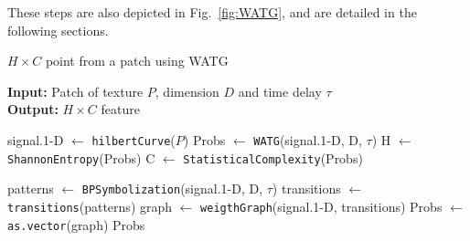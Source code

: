\documentclass[journal]{IEEEtran}
\begin{document}
	These steps are also depicted in Fig.~\ref{fig:WATG}, and are detailed in the following sections.
	
	\begin{algorithm}[hbt]
		\caption{$H \times C$ point from a patch using WATG}
		\label{alg:watg}                                
		\textbf{Input:} Patch of texture $P$, dimension $D$ and time delay \textbf{$\tau$}\\
		\textbf{Output:} $H \times C$ feature
		\begin{algorithmic}[1]
			\State signal.\mbox{1-D} $\gets$ \texttt{hilbertCurve}($P$) \label{Line:Peano}
			\State Probs $\gets$ \texttt{WATG}(signal.\mbox{1-D}, D, $\tau$) \label{Line:Probs}
			\State H $\gets$ \texttt{ShannonEntropy}(Probs) \label{Line:Shannon}
			\State C $\gets$ \texttt{StatisticalComplexity}(Probs) \label{Line:StatisticalComplexity}
			
			\vspace{0.15cm}
			
			\State patterns $\gets$ \label{Line:WATGBegin} \texttt{BPSymbolization}(signal.\mbox{1-D}, D, $\tau$) \label{Line:BP}
			\State transitions $\gets$ \texttt{transitions}(patterns) \label{Line:Transitions}
			\State graph $\gets$ \texttt{weigthGraph}(signal.\mbox{1-D}, transitions) \label{Line:WG}
			\State Probs $\gets$ \texttt{as.vector}(graph) \label{Line:WATGEnd}
			\State \Return Probs
			\EndFunction
		\end{algorithmic}
	\end{algorithm}
	
\end{document}
